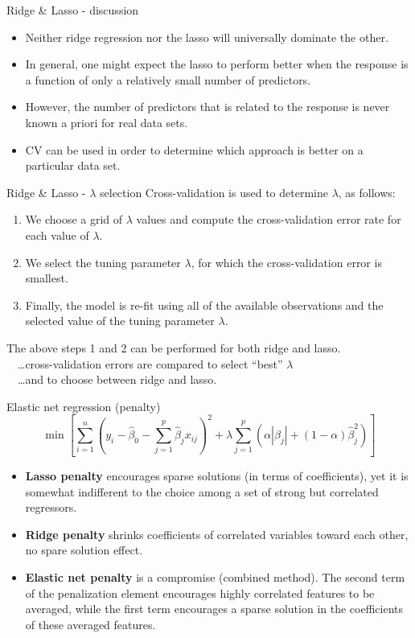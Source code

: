 \documentclass{beamer}
\begin{document}
\begin{frame}{Ridge \& Lasso - discussion}
\begin{itemize}
\item Neither ridge regression nor the lasso will universally dominate the other.
\medskip
\item In general, one might expect the lasso to perform better
when the response is a function of only a relatively small
number of predictors.
\medskip
\item However, the number of predictors that is related to the
response is never known a priori for real data sets.
\medskip
\item CV can be used in order to determine which approach is better on a particular data set.
\end{itemize}
\end{frame}
\begin{frame}{Ridge \& Lasso - $\lambda$ selection}
Cross-validation is used to determine $\lambda$, as follows:
\bigskip
\begin{enumerate}
\item We choose a grid of $\lambda$ values and compute the
cross-validation error rate for each value of $\lambda$.
\medskip
\item We select the tuning parameter $\lambda$, for which the
cross-validation error is smallest.
\medskip
\item Finally, the model is re-fit using all of the available
observations and the selected value of the tuning
parameter $\lambda$.
\end{enumerate}
\bigskip
The above steps 1 and 2 can be performed for both ridge and lasso.\\
~~\dots cross-validation errors are compared to select ``best'' $\lambda$ \\
~~\dots and to choose between ridge and lasso.

\end{frame}
\begin{frame}{Elastic net regression (penalty)}
$$\min \left[ \sum_{i=1}^n \left(y_i - \hat{\beta}_0 
         - \sum_{j=1}^p  \hat{\beta}_j x_{ij} \right)^2 
         \! + \lambda \sum_{j=1}^p 
         \left( \alpha |\beta_j| + (1-\alpha) \hat{\beta}_j^2 \right) \right]
$$
\begin{itemize}
\item \textbf{Lasso penalty} encourages sparse solutions (in terms of coefficients), yet it is somewhat indifferent to the choice among a set of strong but correlated regressors.
\smallskip
\item \textbf{Ridge penalty} shrinks coefficients of correlated variables toward each other, no spare solution effect.
\smallskip
\item \textbf{Elastic net penalty} is a compromise (combined method). The second term of the penalization element encourages highly correlated features to be averaged, while
the first term encourages a sparse solution in the coefficients of these averaged features.
\end{itemize}
\end{frame}
\end{document}
